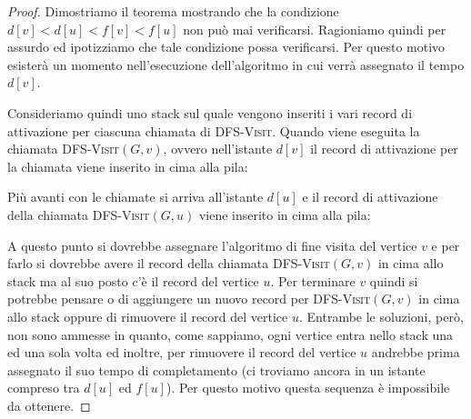 \begin{proof}
Dimostriamo il teorema mostrando che la condizione $d[v]<d[u]<f[v]<f[u]$ non può mai verificarsi. Ragioniamo quindi per assurdo ed ipotizziamo che tale condizione possa verificarsi. Per questo motivo esisterà un momento nell'esecuzione dell'algoritmo in cui verrà assegnato il tempo $d[v]$.

Consideriamo quindi uno stack sul quale vengono inseriti i vari record di attivazione per ciascuna chiamata di \textsc{DFS-Visit}. Quando viene eseguita la chiamata \textsc{DFS-Visit}$(G,v)$, ovvero nell'istante $d[v]$ il record di attivazione per la chiamata viene inserito in cima alla pila:
\begin{center}
\end{center}
Più avanti con le chiamate si arriva all'istante $d[u]$ e il record di attivazione della chiamata \textsc{DFS-Visit}$(G,u)$ viene inserito in cima alla pila:
\begin{center}
\end{center}
A questo punto si dovrebbe assegnare l'algoritmo di fine visita del vertice $v$ e per farlo si dovrebbe avere il record della chiamata \textsc{DFS-Visit}$(G,v)$ in cima allo stack ma al suo posto c'è il record del vertice $u$. Per terminare $v$ quindi si potrebbe pensare o di aggiungere un nuovo record per \textsc{DFS-Visit}$(G,v)$ in cima allo stack oppure di rimuovere il record del vertice $u$. Entrambe le soluzioni, però, non sono ammesse in quanto, come sappiamo, ogni vertice entra nello stack una ed una sola volta ed inoltre, per rimuovere il record del vertice $u$ andrebbe prima assegnato il suo tempo di completamento (ci troviamo ancora in un istante compreso tra $d[u]$ ed $f[u]$). Per questo motivo questa sequenza è impossibile da ottenere.
\end{proof}

